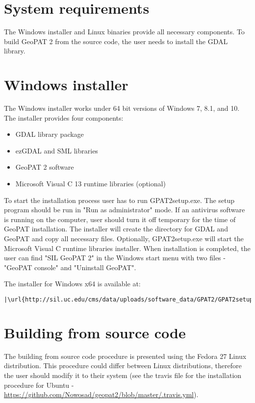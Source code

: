 \section{System requirements}

The Windows installer and Linux binaries provide all necessary components. 
To build GeoPAT 2 from the source code, the user needs to install the GDAL library.

\section{Windows installer}
The Windows installer works under 64 bit versions of Windows 7, 8.1, and 10.
The installer provides four components:
\begin{itemize}
  \item{GDAL library package}
  \item{ezGDAL and SML libraries}
  \item{GeoPAT 2 software}
  \item{Microsoft Visual C 13 runtime libraries (optional)}
\end{itemize}
To start the installation process user has to run GPAT2setup.exe.
The setup program should be run in "Run as administrator" mode.
If an antivirus software is running on the computer, user should turn it off temporary for the time of GeoPAT installation.
The installer will create the directory for GDAL and GeoPAT and copy all necessary files.
Optionally, GPAT2setup.exe will start the Microsoft Visual C runtime libraries installer.
When installation is completed, the user can find "SIL GeoPAT 2" in the Windows start menu with two files - "GeoPAT console" and "Uninstall GeoPAT".

The installer for Windows x64 is available at:

\begin{lstlisting}[escapechar=|]
|\url{http://sil.uc.edu/cms/data/uploads/software_data/GPAT2/GPAT2setup.exe}|
\end{lstlisting}

\section{Building from source code}

The building from source code procedure is presented using the Fedora 27 Linux distribution.
This procedure could differ between Linux distributions, therefore the user should modify it to their system (see the travis file for the installation procedure for Ubuntu - \url{https://github.com/Nowosad/geopat2/blob/master/.travis.yml}).


